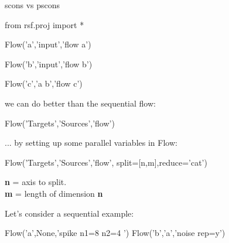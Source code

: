\begin{frame}[fragile]{scons vs pscons}

\begin{python}
from rsf.proj import * 


Flow('a','input','flow a')

Flow('b','input','flow b')

Flow('c','a b','flow c')

\end{python}

\end{frame}

\begin{frame}
\end{frame}

\begin{frame}
\end{frame}



\begin{frame}[fragile]
\vfill 
we can do better than the sequential flow:
\begin{python}      
Flow('Targets','Sources','flow')
\end{python}
\vfill 
\end{frame}



\begin{frame}[fragile] 
\vfill 
... by setting up some parallel variables in Flow:
\begin{python}      
Flow('Targets','Sources','flow',
      split=[n,m],reduce='cat')
\end{python}
{\bf n} = axis to split. \\
{\bf m} = length of dimension {\bf n}
\vfill 
\end{frame}
 


\begin{frame}[fragile] 
Let's consider a sequential example:
\begin{python}
Flow('a',None,'spike n1=8 n2=4 ')
Flow('b','a','noise rep=y')
\end{python}
\end{frame}

\begin{frame}
\end{frame}




